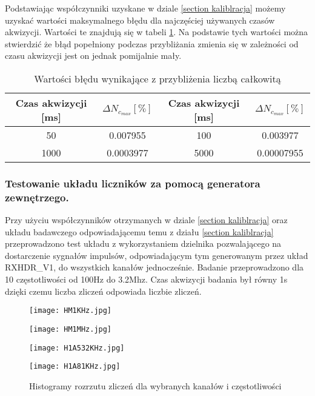 Podstawiając współczynniki uzyskane w dziale \ref{section kaliblracja} możemy uzyskać wartości maksymalnego błędu dla najczęściej używanych czasów akwizycji. Wartości te znajdują się w tabeli \ref{tab przyblizenie niep}. Na podstawie tych wartości można stwierdzić że błąd popełniony podczas przybliżania zmienia się w zależności od czasu akwizycji jest on jednak pomijalnie mały.

\begin{table}
        \centering
        \caption{Wartości błędu wynikające z przybliżenia liczbą całkowitą}
        \label{tab przyblizenie niep}
        \begin{tabular}{|c|c||c|c|}
                \hline
                Czas akwizycji [ms] &   $\Delta N_{c_{max}} [\%]$&Czas akwizycji [ms] &   $\Delta N_{c_{max}} [\%]$ \\ \hline
                50 & 0.007955 & 100 & 0.003977 \\ \hline
                1000 & 0.0003977 & 5000 & 0.00007955 \\ \hline
        \end{tabular}
\end{table}

\subsubsection{Testowanie układu liczników za pomocą generatora zewnętrzego.}

Przy użyciu współczynników otrzymanych w dziale \ref{section kaliblracja} oraz układu badawczego odpowiadającemu temu z działu \ref{section kaliblracja} przeprowadzono test układu z wykorzystaniem dzielnika pozwalającego na dostarczenie sygnałów impulsów, odpowiadającym tym generowanym przez układ RXHDR\_V1, do wszystkich kanałów jednocześnie.
Badanie przeprowadzono dla 10 częstotliwości od 100Hz do 3.2Mhz. Czas akwizycji badania był równy 1s dzięki czemu liczba zliczeń odpowiada liczbie zliczeń. 

\begin{figure}
        \begin{multicols}{2}
            \texttt{[image: HM1KHz.jpg]} \par    
            \texttt{[image: HM1MHz.jpg]} \par    
        \end{multicols} \hfill
        \begin{multicols}{2}
            \texttt{[image: H1A532KHz.jpg]} \par
            \texttt{[image: H1A81KHz.jpg]} \par    
        \end{multicols}
        \caption{Histogramy rozrzutu zliczeń dla wybranych kanałów i częstotliwości}
        \label{hist licz}
\end{figure}



